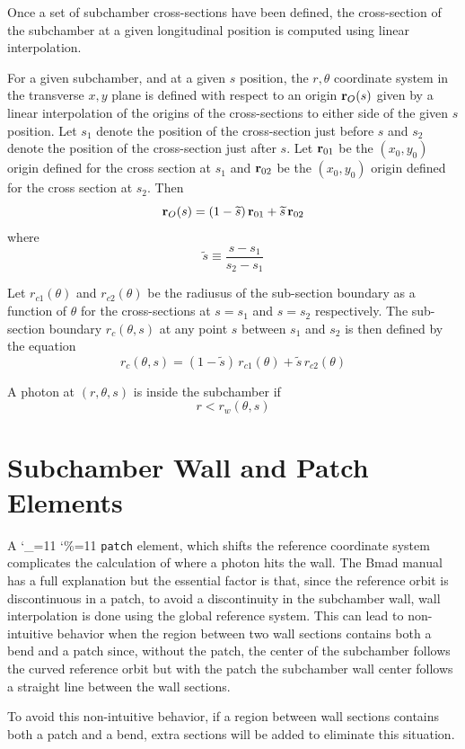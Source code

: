 \documentclass[11pt,openany]{report}
\newcommand\ttcmd{\begingroup\catcode`\_=11 \catcode`\%=11 \dottcmd}
\newcommand\dottcmd[1]{\texttt{#1}\endgroup}
\newcommand{\Begineq}{\begin{equation}}
\newcommand{\Endeq}{\end{equation}}
\newcommand{\vn}{\ttcmd}
\newcommand{\Bf}[1]{{\bf #1}}
\newcommand{\bfr}{\Bf r}
\newcommand{\stilde}{{\widetilde s}}
\begin{document}
Once a set of subchamber cross-sections have been defined, the
cross-section of the subchamber at a given longitudinal position is
computed using linear interpolation. 

For a given subchamber, and 
at a given $s$ position, the $r, \theta$ coordinate system in the
transverse $x, y$ plane is defined with respect to an origin
$\bfr_O(s)$ given by a linear interpolation of the origins of the
cross-sections to either side of the given $s$ position. Let $s_1$
denote the position of the cross-section just before $s$ and $s_2$
denote the position of the cross-section just after $s$. Let
$\bfr_{01}$ be the $(x_0, y_0)$ origin defined for the cross section
at $s_1$ and $\bfr_{02}$ be the $(x_0, y_0)$ origin defined for the
cross section at $s_2$. Then
\Begineq
  \bfr_O(s) = (1 - \stilde) \, \bfr_{01} + \stilde \, \bfr_{02}
\Endeq
where 
\Begineq
  \stilde \equiv \frac{s - s_1}{s_2 - s_1}
\Endeq

Let $r_{c1}(\theta)$ and $r_{c2}(\theta)$ be the radiusus of the
sub-section boundary as a function of $\theta$ for the cross-sections
at $s = s_1$ and $s = s_2$ respectively. The sub-section boundary
$r_c(\theta, s)$ at any point $s$ between $s_1$ and $s_2$ is then
defined by the equation
\Begineq
  r_c(\theta, s) = (1 - \stilde) \, r_{c1}(\theta) + \stilde \, r_{c2}(\theta)
\Endeq

A photon at $(r,\theta, s)$ is inside the subchamber if
\Begineq
  r < r_w(\theta, s)
\Endeq

\section{Subchamber Wall and Patch Elements}
\label{ss:patch}

A \vn{patch} element, which shifts the reference coordinate system
complicates the calculation of where a photon hits the wall. The Bmad
manual has a full explanation but the essential factor is that, since
the reference orbit is discontinuous in a patch, to avoid a
discontinuity in the subchamber wall, wall interpolation is done using
the global reference system. This can lead to non-intuitive behavior
when the region between two wall sections contains both a bend and a
patch since, without the patch, the center of the subchamber follows the
curved reference orbit but with the patch the subchamber wall center
follows a straight line between the wall sections.

To avoid this non-intuitive behavior, if a region between wall sections
contains both a patch and a bend, extra sections will be added to
eliminate this situation.
\end{document}
